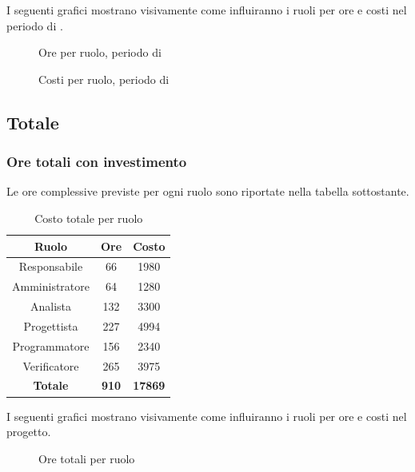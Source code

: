 I seguenti grafici mostrano visivamente come influiranno i ruoli per ore e costi nel periodo di \VV{}.
\begin{figure}[H]
	\centering
	\caption{Ore per ruolo, periodo di \VV}
\end{figure}
\begin{figure}[H]
	\centering
	\caption{Costi per ruolo, periodo di \VV}
\end{figure}

\subsection{Totale}
\subsubsection{Ore totali con investimento}
Le ore complessive previste per ogni ruolo sono riportate nella tabella sottostante.
\begin{table}[H]
	\centering
	\begin{tabular}{|c|c|c|}
		\hline
		\textbf{Ruolo} &
		\textbf{Ore} &
		\textbf{Costo} \\
		\hline
		Responsabile & 66 & 1980\\
		\hline
		Amministratore & 64 & 1280\\
		\hline
		Analista & 132 & 3300\\
		\hline
		Progettista & 227 & 4994 \\
		\hline
		Programmatore & 156 & 2340 \\
		\hline
		Verificatore & 265 & 3975\\
		\hline
		\textbf{Totale} & \textbf{910} & \textbf{17869} \\
		\hline
	\end{tabular}
	\caption{Costo totale per ruolo}
\end{table}
I seguenti grafici mostrano visivamente come influiranno i ruoli per ore e costi nel progetto.
\begin{figure}[H]
	\centering
	\caption{Ore totali per ruolo}
\end{figure}
